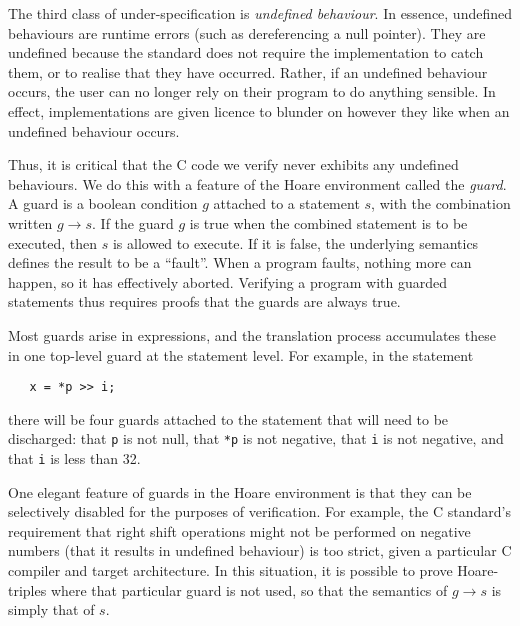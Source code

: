\documentclass{article}
\begin{document}
The third class of under-specification is \emph{undefined behaviour}.
In essence, undefined behaviours are runtime errors (such as
dereferencing a null pointer).  They are undefined because the
standard does not require the implementation to catch them, or to
realise that they have occurred.  Rather, if an undefined behaviour
occurs, the user can no longer rely on their program to do anything
sensible.  In effect, implementations are given licence to blunder on
however they like when an undefined behaviour occurs.

Thus, it is critical that the C code we verify never exhibits any
undefined behaviours.  We do this with a feature of the Hoare
environment called the \emph{guard}.  A guard is a boolean condition
$g$ attached to a statement $s$, with the combination written $g\to
s$.  If the guard $g$ is true when the combined statement is to be
executed, then $s$ is allowed to execute.  If it is false, the
underlying semantics defines the result to be a ``fault''.  When a
program faults, nothing more can happen, so it has effectively
aborted.  Verifying a program with guarded statements thus requires
proofs that the guards are always true.

Most guards arise in expressions, and the
translation process accumulates these in one top-level guard at the
statement level.  For example, in the statement
\begin{verbatim}
   x = *p >> i;
\end{verbatim}
there will be four guards attached to the statement that will need to
be discharged: that \texttt{p} is not null, that \texttt{*p} is not
negative, that \texttt{i} is not negative, and that \texttt{i} is less
than 32.

One elegant feature of guards in the Hoare environment is that they
can be selectively disabled for the purposes of verification.  For
example, the C standard's requirement that right shift operations might not
be performed on negative numbers (that it results in undefined
behaviour) is too strict, given a particular C compiler and target
architecture.  In this situation, it is possible to prove
Hoare-triples where that particular guard is not used, so that the
semantics of $g\to s$ is simply that of $s$.

\end{document}

